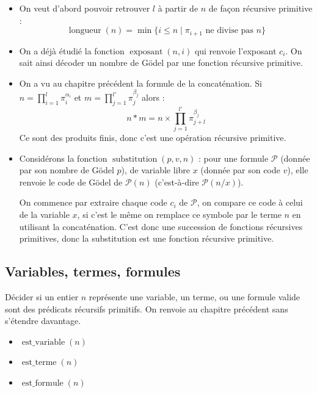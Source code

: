 \documentclass[11pt,class=report,crop=false]{standalone}
\begin{document}
\begin{itemize}
    \item On veut d'abord pouvoir retrouver $l$ à partir de $n$ de façon récursive primitive : 
\[ \operatorname{longueur}(n) = \min \{ i \le n \mid \pi_{i+1} \text{ ne divise pas } n \} \]

    \item On a déjà étudié la fonction $\operatorname{exposant}(n,i)$ qui renvoie l'exposant $c_i$. On sait ainsi décoder un nombre de Gödel par une fonction récursive primitive.

    \item On a vu au chapitre précédent la formule de la concaténation.
    Si $n = \prod_{i=1}^l \pi_i^{\alpha_i}$ et $m = \prod_{j=1}^{l'} \pi_j^{\beta_j}$ 
alors :
\[
    n * m = n \times \prod_{j=1}^{l'} \pi_{j+l}^{\beta_j}
\]
Ce sont des produits finis, donc c'est une opération récursive primitive.

    \item Considérons la fonction $\operatorname{substitution}(p, v, n)$ : pour une formule $\mathcal{P}$ (donnée par son nombre de Gödel $p$), de variable libre $x$ (donnée par son code $v$), elle renvoie le code de Gödel de $\mathcal{P}(n)$ (c'est-à-dire $\mathcal{P}(n/x)$).
    
    On commence par extraire chaque code $c_i$ de $\mathcal{P}$, on compare ce code à celui de la variable $x$, si c'est le même on remplace ce symbole par le terme $n$ en utilisant la concaténation.
    C'est donc une succession de fonctions récursives primitives, donc la substitution est une fonction récursive primitive.
\end{itemize}


\subsection{Variables, termes, formules}

 Décider si un entier $n$ représente une variable, un terme, ou une formule valide sont des prédicats récursifs primitifs. On renvoie au chapitre précédent sans s'étendre davantage.
\begin{itemize}
    \item $\operatorname{est\_variable}(n)$
    \item $\operatorname{est\_terme}(n)$
    \item $\operatorname{est\_formule}(n)$
\end{itemize}
\end{document}
